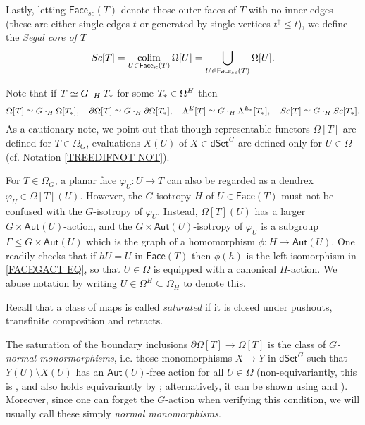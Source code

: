 \documentclass[a4paper,10pt
,draft
]{article}%
\begin{document}
Lastly, letting $\mathsf{Face}_{sc}(T)$ denote those outer faces of $T$ with no inner edges (these are either single edges $t$ or generated by single vertices $t^{\uparrow} \leq t$), we define the 
\textit{Segal core of $T$}
\[
	Sc[T] 
= 
	\mathop{\operatorname{colim}}_{U \in 
	\mathsf{Face_{sc}}(T)}
	\Omega[U] 
=
	\bigcup_{U \in 
	\mathsf{Face}_{sc}(T)}
	\Omega[U].
\]

Note that if $T \simeq G \cdot_H T_{\**}$ for some $T_{\**} \in \Omega^H$ then 
\begin{equation}\label{T_DECOMP_EQ}
	\Omega[T] \simeq G \cdot_H \Omega[T_{\**}], 
\quad
	\partial \Omega[T] \simeq G \cdot_H \partial \Omega[T_{\**}], \quad
	\Lambda^{E}[T] \simeq G \cdot_H \Lambda^{E_{\**}}[T_{\**}],
\quad
	Sc[T] \simeq G \cdot_H Sc[T_{\**}].
\end{equation}
As a cautionary note, we point out that though representable functors $\Omega[T]$ are defined for $T \in \Omega_G$,
evaluations $X(U)$ of $X \in \mathsf{dSet}^G$
are defined only for $U \in \Omega$ (cf. Notation \ref{TREEDIFNOT NOT}).

\begin{remark}\label{FACEGACT REM}
	For $T \in \Omega_G$, a planar face $\varphi_U \colon U \to T$
	can also be regarded as a dendrex $\varphi_U \in \Omega[T](U)$.
	However, the $G$-isotropy $H$ of $U \in \mathsf{Face}(T)$ must not be confused with the $G$-isotropy of $\varphi_U$.
	Instead, $\Omega[T](U)$ has a larger $G \times \mathsf{Aut}(U)$-action,
	and the $G \times \mathsf{Aut}(U)$-isotropy of $\varphi_U$
	is a subgroup 
	$\Gamma \leq G \times \mathsf{Aut}(U)$
	which is the graph of a homomorphism
	$\phi\colon H \to \mathsf{Aut}(U)$.
	One readily checks that if $hU = U$ in $\mathsf{Face}(T)$ then
	$\phi(h)$ is the left isomorphism in \eqref{FACEGACT EQ},
	so that $U\in \Omega$ is equipped with a canonical $H$-action.
	We abuse notation by writing 
	$U \in \Omega^H \subseteq \Omega_H$ to denote this.  
\end{remark}


Recall that a class of maps is called \textit{saturated} if it is closed under pushouts, transfinite composition and retracts. 


The saturation of the boundary inclusions 
$\partial \Omega[T] \to \Omega[T]$
is the class of \textit{$G$-normal monormorphisms},
i.e. those monomorphisms $X \to Y$ in $\mathsf{dSet}^G$ such that
$Y(U) \setminus X(U)$ has an $\mathsf{Aut}(U)$-free action for all $U \in \Omega$ (non-equivariantly, this is \cite[1.3]{CM11}, and also holds equivariantly by \cite[Rem. 6.7]{Per18}; alternatively, it can be shown using \cite[Prop. 6.5(ii)]{Per18} and \cite[Prop. 5.62]{Per18}).
Moreover, since one can forget the $G$-action when verifying this condition, we will usually call these simply \textit{normal monomorphisms}. 
\end{document}
